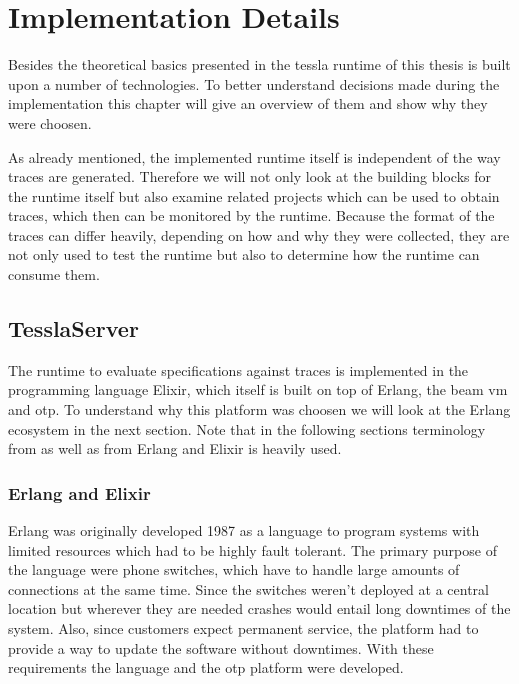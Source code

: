%
\chapter{Implementation Details}
\label{sec:implementation}

Besides the theoretical basics presented in  the \gls{tessla} runtime of this thesis is built upon a number of technologies.
To better understand decisions made during the implementation this chapter will give an overview of them and show why they were choosen.

As already mentioned, the implemented runtime itself is independent of the way traces are generated.
Therefore we will not only look at the building blocks for the runtime itself but also examine related projects which can be used to obtain traces, which then can be monitored by the runtime.
Because the format of the traces can differ heavily, depending on how and why they were collected, they are not only used to test the runtime but also to determine how the runtime can consume them.

\section{TesslaServer}
\label{sec:implementation:tesslaserver}

The runtime to evaluate specifications against traces is implemented in the programming language Elixir, which itself is built on top of Erlang, the \gls{beam} \gls{vm} and \gls{otp}.
To understand why this platform was choosen we will look at the Erlang ecosystem in the next section.
Note that in the following sections terminology from  as well as from Erlang and Elixir is heavily used.

\subsection{Erlang and Elixir}
\label{sec:implementation:tesslaserver:erlang_elixir}

Erlang was originally developed 1987 as a language to program systems with limited resources which had to be highly fault tolerant.
The primary purpose of the language were phone switches, which have to handle large amounts of connections at the same time.
Since the switches weren't deployed at a central location but wherever they are needed crashes would entail long downtimes of the system.
Also, since customers expect permanent service, the platform had to provide a way to update the software without downtimes.
With these requirements the language and the \gls{otp} platform were developed.

